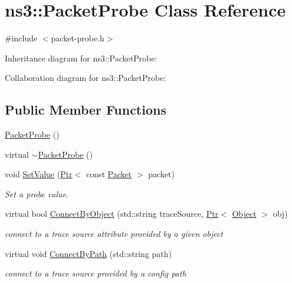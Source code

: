 \hypertarget{classns3_1_1PacketProbe}{}\section{ns3\+:\+:Packet\+Probe Class Reference}
\label{classns3_1_1PacketProbe}


{\ttfamily \#include $<$packet-\/probe.\+h$>$}



Inheritance diagram for ns3\+:\+:Packet\+Probe\+:


Collaboration diagram for ns3\+:\+:Packet\+Probe\+:
\subsection*{Public Member Functions}
\begin{DoxyCompactItemize}
\item 
\hyperlink{classns3_1_1PacketProbe_a9de6aced4333dc3725985b5a78e7985b}{Packet\+Probe} ()
\item 
virtual \hyperlink{classns3_1_1PacketProbe_a9b01cb459770db94e382ac664983bb86}{$\sim$\+Packet\+Probe} ()
\item 
void \hyperlink{classns3_1_1PacketProbe_ae841cdc0b7cd41b828f1b6c89f127706}{Set\+Value} (\hyperlink{classns3_1_1Ptr}{Ptr}$<$ const \hyperlink{classns3_1_1Packet}{Packet} $>$ packet)
\begin{DoxyCompactList}\small\item\em Set a probe value. \end{DoxyCompactList}\item 
virtual bool \hyperlink{classns3_1_1PacketProbe_a2174e6125949d5d7c240eba50d9bbe82}{Connect\+By\+Object} (std\+::string trace\+Source, \hyperlink{classns3_1_1Ptr}{Ptr}$<$ \hyperlink{classns3_1_1Object}{Object} $>$ obj)
\begin{DoxyCompactList}\small\item\em connect to a trace source attribute provided by a given object \end{DoxyCompactList}\item 
virtual void \hyperlink{classns3_1_1PacketProbe_a9cec685e050a759da9fcbb1f20945b10}{Connect\+By\+Path} (std\+::string path)
\begin{DoxyCompactList}\small\item\em connect to a trace source provided by a config path \end{DoxyCompactList}\end{DoxyCompactItemize}
